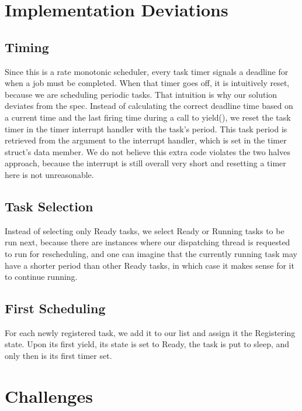 \documentclass{article}
\begin{document}
\section{Implementation Deviations}

\subsection{Timing}
Since this is a rate monotonic scheduler, every task timer signals a deadline for when a job must be completed. When that timer goes off, it is intuitively reset, because we are scheduling periodic tasks. That intuition is why our solution deviates from the spec. Instead of calculating the correct deadline time based on a current time and the last firing time during a call to yield(), we reset the task timer in the timer interrupt handler with the task's period. This task period is retrieved from the argument to the interrupt handler, which is set in the timer struct's data member. We do not believe this extra code violates the two halves approach, because the interrupt is still overall very short and resetting a timer here is not unreasonable.

\subsection{Task Selection}
Instead of selecting only Ready tasks, we select Ready or Running tasks to be run next, because there are instances where our dispatching thread is requested to run for rescheduling, and one can imagine that the currently running task may have a shorter period than other Ready tasks, in which case it makes sense for it to continue running.

\subsection{First Scheduling}
For each newly registered task, we add it to our list and assign it the Registering state. Upon its first yield, its state is set to Ready, the task is put to sleep, and only then is its first timer set.

\section{Challenges}
\end{document}
